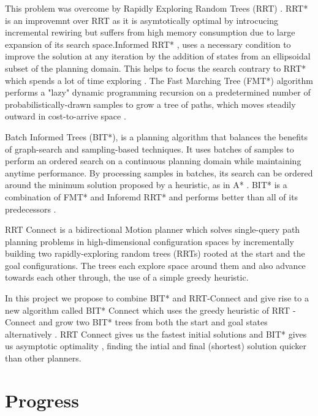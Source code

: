 \documentclass[12pt]{report}
\begin{document}
This problem was overcome by Rapidly Exploring Random Trees (RRT) . RRT* is an improvemnt over RRT as it is asymtotically optimal by introcucing incremental rewiring\cite{6942976} but suffers from high memory consumption due to large expansion of its search space.\cite{noreen2016optimal}Informed RRT* , uses a necessary condition to improve the solution at any iteration by the addition of states from an ellipsoidal subset of the planning domain. \cite{6942976} This helps to focus the search contrary to RRT* which spends a lot of time exploring . The Fast Marching Tree (FMT*) algorithm performs a "lazy" dynamic programming recursion on a predetermined number of probabilistically-drawn samples to grow a tree of paths, which moves steadily outward in cost-to-arrive space \cite{janson2015fast}.

Batch Informed Trees (BIT*), is a planning algorithm that balances the benefits of graph-search and sampling-based techniques. It uses batches of samples to perform an ordered search on a continuous planning domain while maintaining anytime performance. By processing samples in batches, its search can be ordered around the minimum solution proposed by a heuristic, as in A* \cite{7139620}. BIT* is a combination of FMT* and Inforemd RRT* and performs better than all of its predecessors . 

RRT Connect is a bidirectional Motion planner which solves single-query path planning problems in high-dimensional configuration spaces by incrementally building two rapidly-exploring random trees (RRTs) rooted at the start and the goal configurations. The trees each explore space around them and also advance towards each other through, the use of a simple greedy heuristic\cite{844730}.

In this project we propose to combine BIT* and RRT-Connect and give rise to a new algorithm called BIT* Connect which uses the greedy heuristic of RRT - Connect and grow two BIT* trees from both the start and goal states alternatively . RRT Connect gives us the fastest initial solutions and BIT* gives us asymptotic optimality , finding the intial and final (shortest) solution quicker than other planners.







\chapter{Progress}
\end{document}
